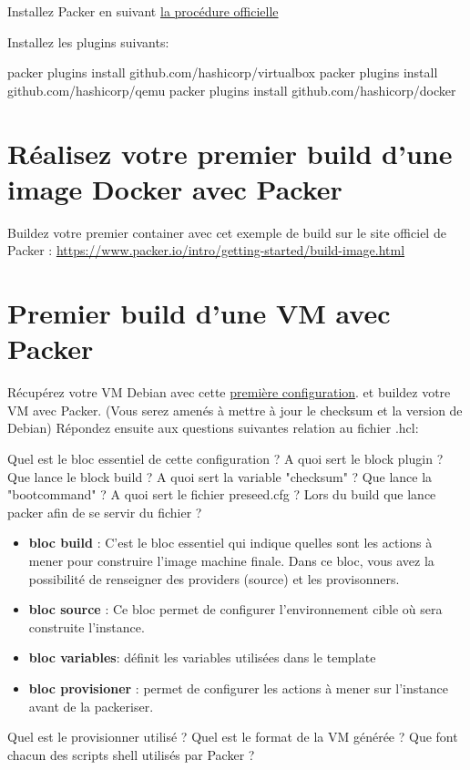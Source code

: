 Installez Packer en suivant \href{https://developer.hashicorp.com/packer/tutorials/docker-get-started/get-started-install-cli}{la procédure officielle}

Installez les plugins suivants:
\begin{bashcode}
packer plugins install github.com/hashicorp/virtualbox
packer plugins install github.com/hashicorp/qemu
packer plugins install github.com/hashicorp/docker
\end{bashcode}

\section{Réalisez votre premier build d'une image Docker avec Packer}

Buildez votre premier container avec cet exemple de build sur le site officiel de Packer : \url{https://www.packer.io/intro/getting-started/build-image.html}

\section{Premier build d'une VM avec Packer}
Récupérez votre VM Debian avec cette \href{https://github.com/pushou/AMORCE-TP-PACKER-R5-devcloud-11.git}{première configuration}.
et buildez votre VM avec Packer. (Vous serez amenés à mettre à jour le checksum et la version de Debian)
Répondez ensuite aux questions suivantes relation au fichier .hcl:
\begin{questions}
    \question Quel est le bloc essentiel de cette configuration ?
    \question A quoi sert le block plugin ?
    \question Que lance le block build ?
    \question A quoi sert la variable "checksum" ?
    \question Que lance la "bootcommand" ? 
    \question A quoi sert le fichier preseed.cfg ?
    \question Lors du build que lance packer afin de se servir du fichier ?
    \begin{solution}
        \begin{itemize}
            \item \textbf{bloc build} : C’est le bloc essentiel qui indique quelles sont les actions à mener pour construire l’image machine 
            finale. Dans ce bloc, vous avez la possibilité de renseigner des providers (source) et les provisonners. 
            \item \textbf{bloc source} : Ce bloc permet de configurer l’environnement cible où sera construite l’instance. 
            \item \textbf{bloc variables}: définit les variables utilisées dans le template
            \item \textbf{bloc provisioner} : permet de configurer les actions à mener sur l’instance avant de la packeriser.
        \end{itemize}
    \end{solution}
    \question Quel est le provisionner utilisé ?   
    \question Quel est le format de la VM générée ?
    \question Que font chacun des scripts shell utilisés par Packer ?
\end{questions}

